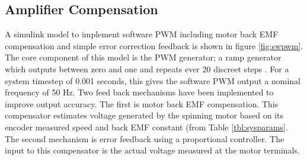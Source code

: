 






\subsection{Amplifier Compensation}

A simulink model to implement software PWM including motor back EMF compensation and simple error correction feedback is shown in figure \ref{fig:swpwm}.
The core component of this model is the PWM generator; a ramp generator which outputs between zero and one and repeats ever 20 discreet steps . 
For a system timestep of 0.001 seconds, this gives the software PWM output a nominal frequency of 50 Hz.
Two feed back mechanisms have been implemented to improve output accuracy. 
The first is motor back EMF compensation.
This compensator estimates voltage generated by the spinning motor based on its encoder measured speed and back EMF constant (from Table \ref{tbl:sysparams}.
The second mechanism is error feedback using a proportional controller.
The input to this compensator is the actual voltage measured at the motor terminals.	

